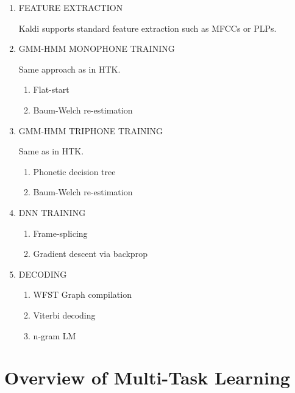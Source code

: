 \documentclass[10pt,a4paper]{article}
\begin{document}
\begin{enumerate}

\item FEATURE EXTRACTION
  
  Kaldi supports standard feature extraction such as MFCCs or PLPs.

\item GMM-HMM MONOPHONE TRAINING

  Same approach as in HTK.
  
  \begin{enumerate}
  \item Flat-start
  \item Baum-Welch re-estimation
  \end{enumerate}
  
\item GMM-HMM TRIPHONE TRAINING

  Same as in HTK.
  
    \begin{enumerate}
    \item Phonetic decision tree
    \item Baum-Welch re-estimation
    \end{enumerate}

    
  \item DNN TRAINING
    \begin{enumerate}
    \item Frame-splicing
    \item Gradient descent via backprop
    \end{enumerate}
    
\item DECODING
  \begin{enumerate}
  \item WFST Graph compilation
  \item Viterbi decoding
  \item n-gram LM
  \end{enumerate}
  
\end{enumerate}









\newpage

\section{Overview of Multi-Task Learning}
\end{document}
